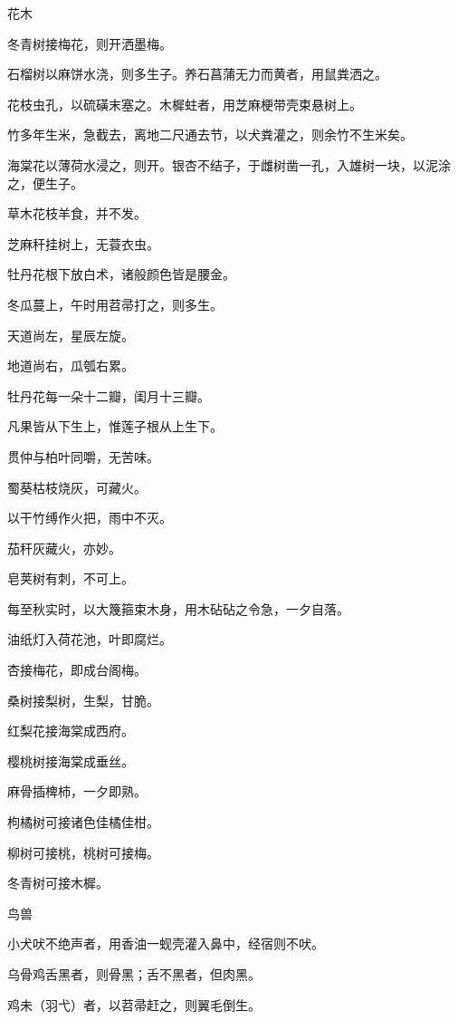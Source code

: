 \documentclass[a4paper,12pt,UTF8,twoside]{ctexbook}
\begin{document}
    花木
    
    冬青树接梅花，则开洒墨梅。
    
    石榴树以麻饼水浇，则多生子。养石菖蒲无力而黄者，用鼠粪洒之。
    
    花枝虫孔，以硫磺末塞之。木樨蛀者，用芝麻梗带壳束悬树上。
    
    竹多年生米，急截去，离地二尺通去节，以犬粪灌之，则余竹不生米矣。
    
    海棠花以薄荷水浸之，则开。银杏不结子，于雌树凿一孔，入雄树一块，以泥涂之，便生子。
    
    草木花枝羊食，并不发。
    
    芝麻秆挂树上，无蓑衣虫。
    
    牡丹花根下放白术，诸般颜色皆是腰金。
    
    冬瓜蔓上，午时用苕帚打之，则多生。
    
    天道尚左，星辰左旋。
    
    地道尚右，瓜瓠右累。
    
    牡丹花每一朵十二瓣，闺月十三瓣。
    
    凡果皆从下生上，惟莲子根从上生下。
    
    贯仲与柏叶同嚼，无苦味。
    
    蜀葵枯枝烧灰，可藏火。
    
    以干竹缚作火把，雨中不灭。
    
    茄秆灰藏火，亦妙。
    
    皂荚树有刺，不可上。
    
    每至秋实时，以大篾箍束木身，用木砧砧之令急，一夕自落。
    
    油纸灯入荷花池，叶即腐烂。
    
    杏接梅花，即成台阁梅。
    
    桑树接梨树，生梨，甘脆。
    
    红梨花接海棠成西府。
    
    樱桃树接海棠成垂丝。
    
    麻骨插椑柿，一夕即熟。
    
    枸橘树可接诸色佳橘佳柑。
    
    柳树可接桃，桃树可接梅。
    
    冬青树可接木樨。
    
    鸟兽
    
    小犬吠不绝声者，用香油一蚬壳灌入鼻中，经宿则不吠。
    
    乌骨鸡舌黑者，则骨黑；舌不黑者，但肉黑。
    
    鸡未（羽弋）者，以苕帚赶之，则翼毛倒生。
    
\end{document}
